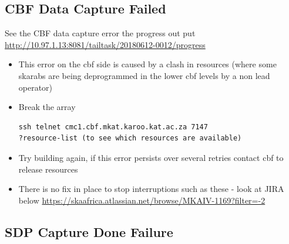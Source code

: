 \subsection{CBF Data Capture Failed}
See the CBF data capture error the progress out put \\
\url{http://10.97.1.13:8081/tailtask/20180612-0012/progress}
\begin{itemize}
	\item{} This error on the cbf side is caused by a clash in resources (where some skarabs are being deprogrammed in the lower cbf levels by a non lead operator)
	\item{} Break the array
\begin{lstlisting}[style=DOS]
ssh telnet cmc1.cbf.mkat.karoo.kat.ac.za 7147
?resource-list (to see which resources are available)
\end{lstlisting}

	\item{} Try building again, if this error persists over several retries contact cbf to release resources
	\item{} There is no fix in place to stop interruptions such as these - look at JIRA below
\url{https://skaafrica.atlassian.net/browse/MKAIV-1169?filter=-2}



\end{itemize}
\subsection{SDP Capture Done Failure}


